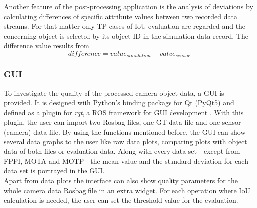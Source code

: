 Another feature of the post-processing application is the analysis of deviations by calculating differences of specific attribute values between two recorded data streams. For that matter only \ac{TP} cases of IoU evaluation are regarded and the concerning object is selected by its object \ac{ID} in the simulation data record. The difference value results from
\begin{equation}
	difference = value_{simulation} - value_{sensor} 
	\label{eq:diff}
\end{equation}

\subsubsection{\ac{GUI}}
To investigate the quality of the processed camera object data, a \ac{GUI} is provided. It is designed with Python's binding package for Qt (PyQt5) \cite{PyQt5} and defined as a plugin for \textit{rqt}, a \ac{ROS} framework for \ac{GUI} development \cite{rqt}.
With this plugin, the user can import two Rosbag files, one GT data file and one sensor (camera) data file.
By using the functions mentioned before, the \ac{GUI} can show several data graphs to the user like raw data plots, comparing plots with object data of both files or evaluation data. 
Along with every data set - except from FPPI, MOTA and MOTP - the mean value and the standard deviation for each data set is portrayed in the \ac{GUI}. \\
Apart from data plots the interface can also show quality parameters for the whole camera data Rosbag file in an extra widget. For each operation where IoU calculation is needed, the user can set the threshold value for the evaluation. 